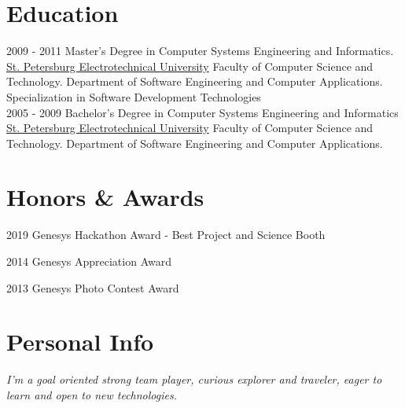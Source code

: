 \documentclass[]{friggeri-cv}
\begin{document}
\section{Education}
\begin{entrylist}
  \entry
    {2009 - 2011}
    {Master's Degree in Computer Systems Engineering and Informatics.\\}
    {\href{http://www.eltech.ru/en/}{St. Petersburg Electrotechnical University}}
    {Faculty of Computer Science and Technology. Department of Software Engineering and Computer Applications. Specialization in Software Development Technologies\\}
  \entry
    {2005 - 2009}
    {Bachelor's Degree in Computer Systems Engineering and Informatics\\}
    {\href{http://www.eltech.ru/en/}{St. Petersburg Electrotechnical University}}
    {Faculty of Computer Science and Technology. Department of Software Engineering and Computer Applications.\\}
\end{entrylist}

\section{Honors \& Awards}
\begin{entrylist}
  \entry
    {2019}
    {Genesys Hackathon Award - Best Project and Science Booth}{}{}
\end{entrylist}

\begin{entrylist}
  \entry
    {2014}
    {Genesys Appreciation Award}{}{}
\end{entrylist}

\begin{entrylist}
  \entry
    {2013}
    {Genesys Photo Contest Award}{}{}
\end{entrylist}

\section{Personal Info}
\emph{I'm a goal oriented strong team player, curious explorer and traveler, eager to learn and open to new technologies.}
\end{document}
